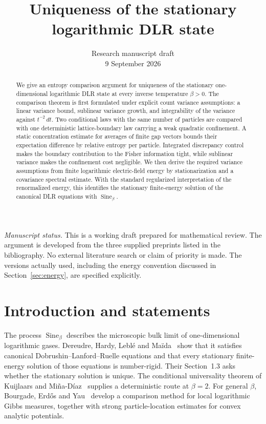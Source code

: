\documentclass[11pt,reqno]{amsart}
\title[Uniqueness of the logarithmic DLR state]{Uniqueness of the stationary logarithmic DLR state}
\date{Research manuscript draft\\9 September 2026}
\numberwithin{equation}{section}
\theoremstyle{definition}
\theoremstyle{remark}
\newcommand{\1}{\mathbf 1}
\newcommand{\Sine}{\operatorname{Sine}}
\newcommand{\dd}{\,d}
\begin{document}
\begin{abstract}
We give an entropy comparison argument for uniqueness of the stationary
one-dimensional logarithmic DLR state at every inverse temperature
$\beta>0$. The comparison theorem is first formulated under explicit count
variance assumptions: a linear variance bound, sublinear variance growth,
and integrability of the variance against $t^{-2}\dd t$. Two conditional
laws with the same number of particles are compared with one deterministic
lattice-boundary law carrying a weak quadratic confinement. A static
concentration estimate for averages of finite gap vectors bounds their
expectation difference by relative entropy per particle. Integrated
discrepancy control makes the boundary contribution to the Fisher
information tight, while sublinear variance makes the confinement cost
negligible. We then derive the required variance assumptions from finite
logarithmic electric-field energy by stationarization and a covariance
spectral estimate. With the standard regularized interpretation of the
renormalized energy, this identifies the stationary finite-energy solution
of the canonical DLR equations with $\Sine_\beta$.
\end{abstract}
\maketitle

\noindent\textit{Manuscript status.}
This is a working draft prepared for mathematical review. The argument is
developed from the three supplied preprints listed in the bibliography.
No external literature search or claim of priority is made. The versions
actually used, including the energy convention discussed in
Section~\ref{sec:energy}, are specified explicitly.

\section{Introduction and statements}

The process $\Sine_\beta$ describes the microscopic bulk limit of
one-dimensional logarithmic gases. Dereudre, Hardy, Lebl\'e and
Ma\"ida~\cite{DHLM} show that it satisfies canonical Dobrushin--Lanford--Ruelle
equations and that every stationary finite-energy solution of those
equations is number-rigid. Their Section~1.3 asks whether the stationary
solution is unique. The conditional universality theorem of Kuijlaars and
Mi\~na-D\'iaz~\cite{KMD} supplies a deterministic route at $\beta=2$.
For general $\beta$, Bourgade, Erd\H{o}s and Yau~\cite{BEY} develop a
comparison method for local logarithmic Gibbs measures, together with
strong particle-location estimates for convex analytic potentials.
\end{document}
